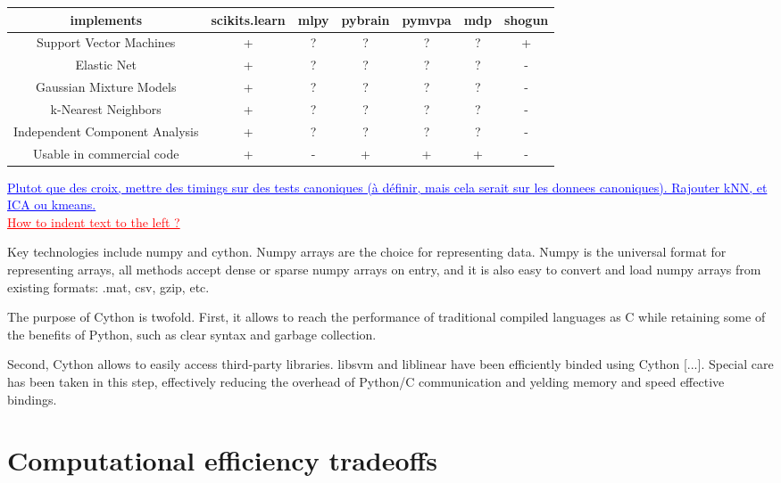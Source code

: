 \documentclass[twoside,11pt]{article}
\newcommand{\GAEL}[1]{\textcolor{blue}{\uline{#1}}}
\newcommand{\FABIAN}[1]{\textcolor{red}{\uline{#1}}}
\begin{document}
\begin{center}


\begin{tabular}{c c c c c c c}
\hline\hline %
implements & scikits.learn & mlpy & pybrain & pymvpa &  mdp & shogun \\ [0.5ex]
\hline
Support Vector Machines        & + & ?   & ?       &  ?     & ?    & + \\
Elastic Net & + & ?   & ?       &  ?     & ?    & - \\
Gaussian Mixture Models  & + & ?   & ?       &  ?     & ?    & - \\
k-Nearest Neighbors & + & ?   & ?       &  ?     & ?    & - \\
Independent Component Analysis & + & ?   & ?       &  ?     & ?    & - \\
Usable in commercial code &  + & -   & +       &  +     & +    & - \\
\hline
\end{tabular}
\GAEL{Plutot que des croix, mettre des timings sur des tests canoniques (à 
définir, mais cela serait sur les donnees canoniques). Rajouter kNN, et
ICA ou kmeans.}\\
\FABIAN{How to indent text to the left ?}
\end{center}


Key technologies include numpy and cython. Numpy arrays are the choice for
representing data. Numpy is the universal format for representing
arrays, all methods accept dense or sparse numpy arrays on entry, and
it is also easy to convert and load numpy arrays from existing formats:
.mat, csv, gzip, etc.

The purpose of Cython is twofold. First, it allows to reach the
performance of traditional compiled languages as C while retaining
some of the benefits of Python, such as clear syntax and garbage
collection.

Second, Cython allows to easily access third-party libraries. libsvm
and liblinear have been efficiently binded using Cython [...]. Special
care has been taken in this step, effectively reducing the overhead of
Python/C communication and yelding memory and speed effective bindings.


\section{Computational efficiency tradeoffs}
\end{document}
